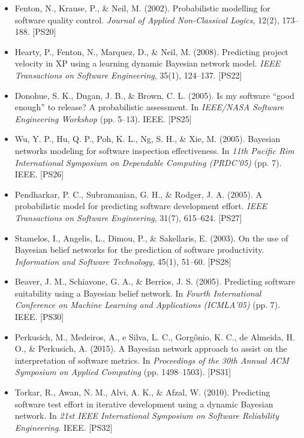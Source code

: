 \begin{itemize}
\item Fenton, N., Krause, P., \& Neil, M. (2002).
Probabilistic modelling for software quality control.
\textit{Journal of Applied Non-Classical Logics}, 12(2), 173--188. [PS20]

\item Hearty, P., Fenton, N., Marquez, D., \& Neil, M. (2008).
Predicting project velocity in XP using a learning dynamic Bayesian network model.
\textit{IEEE Transactions on Software Engineering}, 35(1), 124--137. [PS22]

\item Donohue, S. K., Dugan, J. B., \& Brown, C. L. (2005).
Is my software ``good enough'' to release? A probabilistic assessment.
In \textit{IEEE/NASA Software Engineering Workshop} (pp. 5--13). IEEE. [PS25]

\item Wu, Y. P., Hu, Q. P., Poh, K. L., Ng, S. H., \& Xie, M. (2005).
Bayesian networks modeling for software inspection effectiveness.
In \textit{11th Pacific Rim International Symposium on Dependable Computing (PRDC'05)} (pp. 7). IEEE. [PS26]

\item Pendharkar, P. C., Subramanian, G. H., \& Rodger, J. A. (2005).
A probabilistic model for predicting software development effort.
\textit{IEEE Transactions on Software Engineering}, 31(7), 615--624. [PS27]

\item Stamelos, I., Angelis, L., Dimou, P., \& Sakellaris, E. (2003).
On the use of Bayesian belief networks for the prediction of software productivity.
\textit{Information and Software Technology}, 45(1), 51--60. [PS28]

\item Beaver, J. M., Schiavone, G. A., \& Berrios, J. S. (2005).
Predicting software suitability using a Bayesian belief network.
In \textit{Fourth International Conference on Machine Learning and Applications (ICMLA'05)} (pp. 7). IEEE. [PS30]

\item Perkusich, M., Medeiros, A., e Silva, L. C., Gorgônio, K. C., de Almeida, H. O., \& Perkusich, A. (2015).
A Bayesian network approach to assist on the interpretation of software metrics.
In \textit{Proceedings of the 30th Annual ACM Symposium on Applied Computing} (pp. 1498--1503). [PS31]

\item Torkar, R., Awan, N. M., Alvi, A. K., \& Afzal, W. (2010).
Predicting software test effort in iterative development using a dynamic Bayesian network.
In \textit{21st IEEE International Symposium on Software Reliability Engineering}. IEEE. [PS32]


\end{itemize}
